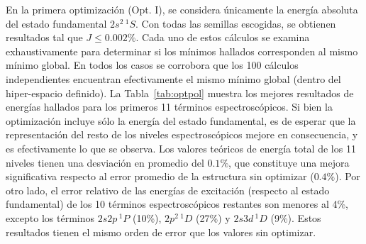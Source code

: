 En la primera optimización (Opt. I), se considera únicamente la energía
absoluta del estado fundamental $2s^2\,^1S$. Con todas las semillas 
escogidas, se obtienen resultados tal que $J\leq 0.002\%$. Cada uno de
estos cálculos se examina exhaustivamente para determinar si los mínimos 
hallados corresponden al mismo mínimo global. En todos los casos se 
corrobora que los 100 cálculos independientes encuentran efectivamente 
el mismo mínimo global (dentro del hiper-espacio definido). La 
Tabla~\ref{tab:optpol} muestra los mejores resultados de energías 
hallados para los primeros 11 términos espectroscópicos. Si bien la 
optimización incluye sólo la energía del estado fundamental, 
es de esperar que la representación del resto de los niveles 
espectroscópicos mejore en consecuencia, y es efectivamente lo que se 
observa. Los valores teóricos de energía total de los 11 niveles tienen
una desviación en promedio del $0.1\%$, que constituye una mejora 
significativa respecto al error promedio de la estructura sin optimizar
($0.4\%$).
Por otro lado, el error relativo de las energías de excitación (respecto 
al estado fundamental) de los 10 términos espectroscópicos restantes 
son menores al 4\%, excepto los términos $2s2p\,^1P$ (10\%), $2p^2\,^1D$ 
(27\%) y $2s3d\,^1D$ (9\%). Estos resultados tienen el mismo orden de 
error que los valores sin optimizar.

